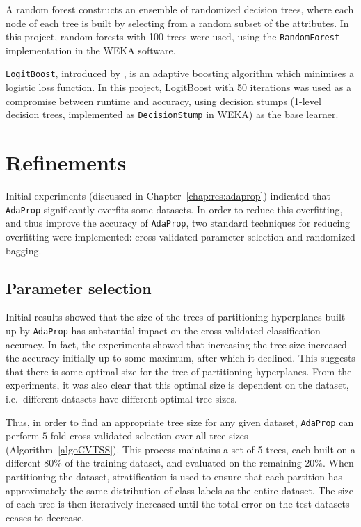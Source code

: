 \documentclass[a4paper,12pt]{report} %
\newcommand{\AdaProp}{\texttt{AdaProp}\xspace}
\newcommand{\blRF}{\texttt{RandomForest}\xspace}
\newcommand{\blLB}{\texttt{LogitBoost}\xspace}
\begin{document}
A random forest \cite{breiman} constructs an ensemble of 
    randomized decision trees, where each node of each tree is 
    built by selecting from a random subset of the attributes.
In this project, random forests with 100 trees were used, 
	using the \blRF implementation in the WEKA software.

\pagebreak

\blLB, introduced by , 
	is an adaptive boosting algorithm 
    which minimises a logistic loss function.
In this project, LogitBoost with 50 iterations was used 
	as a compromise between runtime and accuracy, 
    using decision stumps (1-level decision trees, implemented as \texttt{DecisionStump} in WEKA) as the base learner.


\section{Refinements}
\label{sec:method:refinements}

Initial experiments (discussed in Chapter~\ref{chap:res:adaprop}) 
	indicated that \AdaProp significantly overfits some datasets.
In order to reduce this overfitting, 
    and thus improve the accuracy of \AdaProp, 
    two standard techniques for reducing overfitting were implemented: 
    cross validated parameter selection
    and randomized bagging.


\subsection{Parameter selection}
\label{methodParamSel}

Initial results showed that the 
	size of the trees of partitioning hyperplanes 
    built up by \AdaProp has substantial impact on
    the cross-validated classification accuracy.
In fact, the experiments showed that increasing the tree
    size increased the accuracy initially up to some 
    maximum, after which it declined.
This suggests that there is some optimal size 
    for the tree of partitioning hyperplanes.
From the experiments, it was also clear that this
    optimal size is dependent on the dataset, 
    i.e.\ different datasets have different optimal tree sizes.
    
Thus, in order to find an appropriate tree size for any given dataset, 
    \AdaProp can perform $5$-fold cross-validated selection 
    over all tree sizes (Algorithm~\ref{algoCVTSS}).
This process maintains a set of 5 trees, each built on 
    a different 80\% of the training dataset, 
    and evaluated on the remaining 20\%.
When partitioning the dataset, stratification is used to ensure that
	each partition has approximately the same distribution of class labels as the entire dataset.
The size of each tree is then iteratively increased
    until the total error on the test datasets ceases to decrease.
   
\end{document}
